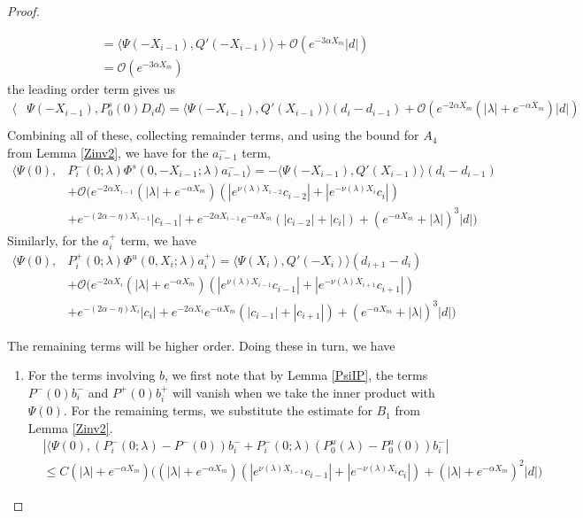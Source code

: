 \documentclass[thesis.tex]{subfiles}
\begin{document}
\begin{lemma}
\begin{proof}
\begin{enumerate}
\begin{align*}
&= \langle \Psi(-X_{i-1}), Q'(-X_{i-1})\rangle + \mathcal{O}(e^{-3 \alpha X_m}|d|) \\
&= \mathcal{O}(e^{-3 \alpha X_m})
\end{align*}
the leading order term gives us
\begin{align*}
\langle &\Psi(-X_{i-1}), P_0^s(0) D_i d \rangle = \langle \Psi(-X_{i-1}), Q'(X_{i-1}) \rangle (d_i - d_{i-1} ) + \mathcal{O}(e^{-2 \alpha X_m}(|\lambda| + e^{-\alpha X_m})|d|) \\
\end{align*}
Combining all of these, collecting remainder terms, and using the bound for $A_4$ from Lemma \ref{Zinv2}, we have for the $a_{i-1}^-$ term,
\begin{align*}
\langle \Psi(0), &P_i^-(0; \lambda) \Phi^s(0, -X_{i-1}; \lambda) a_{i-1}^- \rangle = -\langle \Psi(-X_{i-1}), Q'(X_{i-1}) \rangle (d_i - d_{i-1} ) \\
&+ \mathcal{O}\Big(  
e^{-2\alpha X_{i-1}} (|\lambda| + e^{-\alpha X_m})(|e^{\nu(\lambda)X_{i-2}} c_{i-2}| + |e^{-\nu(\lambda)X_i}c_i|) \\
&+ e^{-(2 \alpha - \eta)X_{i-1}}|c_{i-1}| + e^{-2\alpha X_{i-1}} e^{-\alpha X_m}(|c_{i-2}| + |c_i|) + (e^{-\alpha X_m} + |\lambda|)^3 |d| \Big) 
\end{align*}
Similarly, for the $a_i^+$ term, we have
\begin{align*}
\langle \Psi(0), &P_i^+(0; \lambda) \Phi^u(0, X_i; \lambda) a_i^+ \rangle = \langle \Psi(X_i), Q'(-X_i) \rangle (d_{i+1} - d_i ) \\
&+ \mathcal{O}\Big( e^{-2\alpha X_i} (|\lambda| + e^{-\alpha X_m})(|e^{\nu(\lambda)X_{i-1}} c_{i-1}| + |e^{-\nu(\lambda)X_{i+1}}c_{i+1}|) \nonumber \\
&+ e^{-(2\alpha - \eta)X_i}|c_i| + e^{-2\alpha X_i} e^{-\alpha X_m}(|c_{i-1}| + |c_{i+1}|) + (e^{-\alpha X_m} + |\lambda|)^3 |d| \Big) 
\end{align*}
\end{enumerate}

The remaining terms will be higher order. Doing these in turn, we have

\begin{enumerate}
\item For the terms involving $b$, we first note that by Lemma \ref{PsiIP}, the terms $P^-(0) b_i^-$ and $P^+(0)b_i^+$ will vanish when we take the inner product with $\Psi(0)$. For the remaining terms, we substitute the estimate for $B_1$ from Lemma \ref{Zinv2}.
\begin{align*}
&|\langle \Psi(0), (P_i^-(0; \lambda) - P^-(0))b_i^- + P_i^-(0; \lambda)(P_0^u(\lambda) - P_0^u(0))b_i^-| \\
&\leq C (|\lambda| + e^{-\alpha X_m})\Big( 
(|\lambda| + e^{-\alpha X_m})( |e^{\nu(\lambda)X_{i-1}} c_{i-1}| + |e^{-\nu(\lambda)X_i} c_i|)+ (|\lambda| + e^{-\alpha X_m})^2|d| \Big)
\end{align*}


\end{enumerate}
\end{proof}
\end{lemma}
\end{document}
